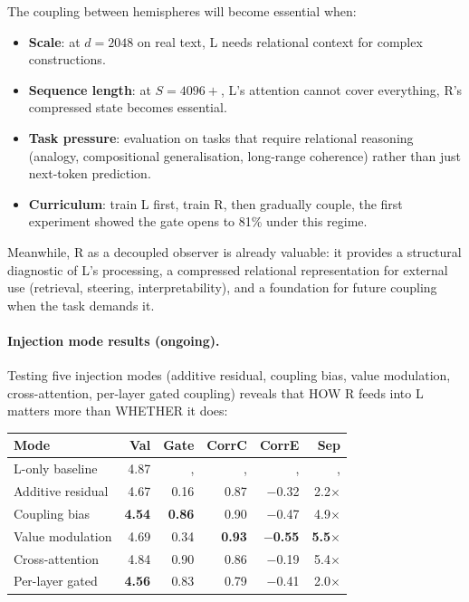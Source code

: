 \documentclass[11pt, a4paper]{article}
\theoremstyle{plain}
\theoremstyle{definition}
\theoremstyle{remark}
\begin{document}
The coupling between hemispheres will become essential when:
\begin{itemize}[nosep]
\item \textbf{Scale}: at $d = 2048$ on real text, L needs relational context for complex constructions.
\item \textbf{Sequence length}: at $S = 4096+$, L's attention cannot cover everything, R's compressed state becomes essential.
\item \textbf{Task pressure}: evaluation on tasks that require relational reasoning (analogy, compositional generalisation, long-range coherence) rather than just next-token prediction.
\item \textbf{Curriculum}: train L first, train R, then gradually couple, the first experiment showed the gate opens to 81\% under this regime.
\end{itemize}

Meanwhile, R as a decoupled observer is already valuable: it provides a structural diagnostic of L's processing, a compressed relational representation for external use (retrieval, steering, interpretability), and a foundation for future coupling when the task demands it.

\paragraph{Injection mode results (ongoing).}
Testing five injection modes (additive residual, coupling bias, value modulation, cross-attention, per-layer gated coupling) reveals that HOW R feeds into L matters more than WHETHER it does:

\begin{center}\small
\begin{tabular}{lrrrrr}
\toprule
\textbf{Mode} & \textbf{Val} & \textbf{Gate} & \textbf{CorrC} & \textbf{CorrE} & \textbf{Sep} \\
\midrule
L-only baseline & 4.87 & ,  & ,  & ,  & ,  \\
Additive residual & 4.67 & 0.16 & 0.87 & $-$0.32 & 2.2$\times$ \\
Coupling bias & \textbf{4.54} & \textbf{0.86} & 0.90 & $-$0.47 & 4.9$\times$ \\
Value modulation & 4.69 & 0.34 & \textbf{0.93} & \textbf{$-$0.55} & \textbf{5.5$\times$} \\
Cross-attention & 4.84 & 0.90 & 0.86 & $-$0.19 & 5.4$\times$ \\
Per-layer gated & \textbf{4.56} & 0.83 & 0.79 & $-$0.41 & 2.0$\times$ \\
\bottomrule
\end{tabular}
\end{center}
\end{document}
